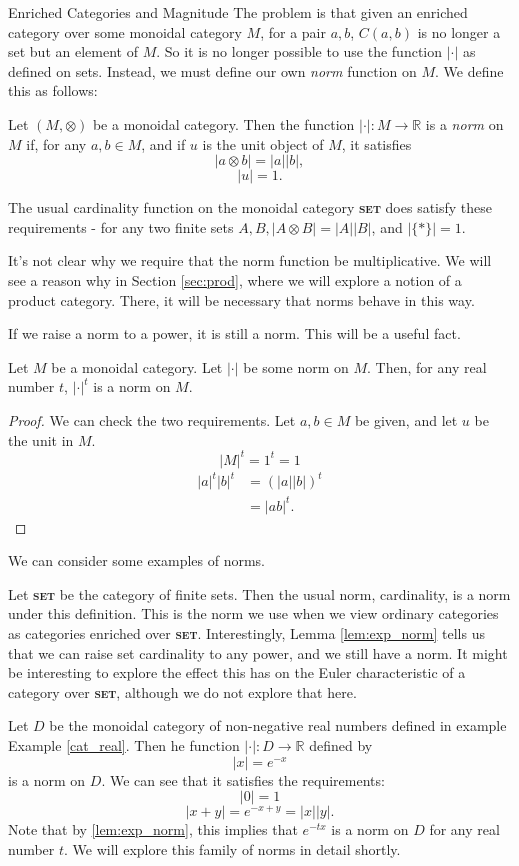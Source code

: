\documentclass[12pt]{pom_thesis}
\newcommand{\catname}[1]{\textbf{\textsc{#1}}}
\newcommand{\Rr}{\mathbb{R}}
\begin{document}
\begin{chapter}{Enriched Categories and Magnitude}
The problem is that given an enriched category over some monoidal category $M$, for a pair $a,b$, $C(a,b)$ is no longer a set but an element of $M$. So it is no longer possible to use the function $|\cdot|$ as defined on sets. Instead, we must define our own \emph{norm} function on $M$. We define this as follows:
\begin{defn}\label{def:norm}
Let $(M,\otimes)$ be a monoidal category. Then the function $| \cdot |: M \rightarrow \Rr$ is a \emph{norm} on $M$ if, for any $a,b\in M$, and if $u$ is the unit object of $M$, it satisfies
\[
|a \otimes b| = |a||b|,
\]
\[
|u| = 1.
\]
\end{defn}

The usual cardinality function on the monoidal category \catname{set} does satisfy these requirements - for any two finite sets $A,B, |A \otimes B| = |A||B|$, and $|\{*\}|=1$.

It's not clear why we require that the norm function be multiplicative. We will see a reason why in Section \ref{sec:prod}, where we will explore a notion of a product category. There, it will be necessary that norms behave in this way.

If we raise a norm to a power, it is still a norm. This will be a useful fact.
\begin{lemma}\label{lem:exp_norm}
Let $M$ be a monoidal category. Let $|\cdot|$ be some norm on $M$. Then, for any real number $t$,  $|\cdot|^t$ is a norm on $M$.
\end{lemma}
\begin{proof}
We can check the two requirements. Let $a,b \in M$ be given, and let $u$ be the unit in $M$.
\[|M|^t = 1^t = 1
\]
\begin{align*}
|a|^t|b|^t &= (|a||b|)^t\\
&= |ab|^t.
\end{align*}
\end{proof}

We can consider some examples of norms.
\begin{examp}
Let \catname{set} be the category of finite sets. Then the usual norm, cardinality, is a norm under this definition. This is the norm we use when we view ordinary categories as categories enriched over \catname{set}. Interestingly, Lemma \ref{lem:exp_norm} tells us that we can raise set cardinality to any power, and we still have a norm. It might be interesting to explore the effect this has on the Euler characteristic of a category over \catname{set}, although we do not explore that here.
\end{examp}
\begin{examp}\label{ex:exp_norm}
Let $D$ be the monoidal category of non-negative real numbers defined in example Example \ref{cat_real}. Then he function $|\cdot|:D \rightarrow \Rr$ defined by 
\[
|x| = e^{-x}
\]
is a norm on $D$. We can see that it satisfies the requirements:
\[|0| = 1
\]
\[|x + y| = e^{-x + y} = |x||y|.
\]
Note that by \ref{lem:exp_norm}, this implies that $e^{-tx}$ is a norm on $D$ for any real number $t$. We will explore this family of norms in detail shortly.
\end{examp}


\end{chapter}
\end{document}
